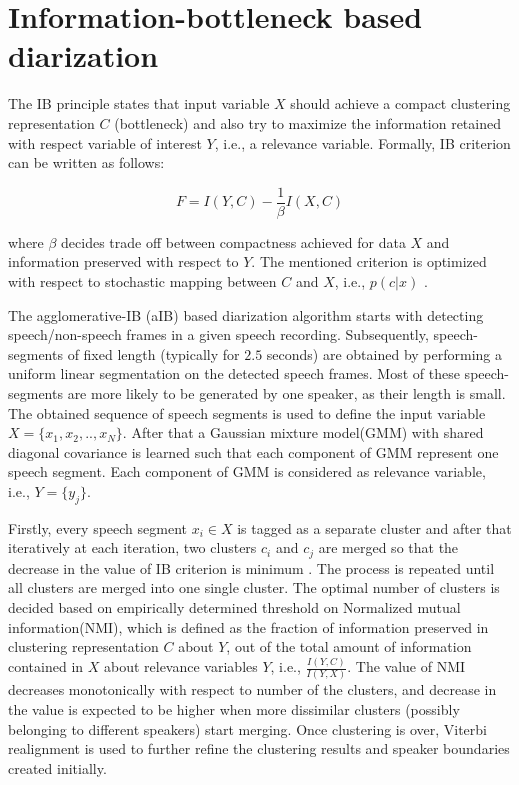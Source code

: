 \documentclass[conference]{IEEEtran}
\begin{document}
\section{Information-bottleneck based diarization}
\label{system}


The IB principle states that input variable $X$ should achieve a compact clustering representation $C$ (bottleneck) and also try to maximize the information retained with respect variable of interest $Y$, i.e., a relevance variable. Formally, IB criterion can be written as follows:

\begin{equation}
\label{eq:aIB}
F = I(Y,C) - \frac{1}{\beta}I(X,C) 
\end{equation} 

where $\beta$ decides trade off between compactness achieved for data $X$ and information preserved with respect to $Y$. The mentioned criterion is optimized with respect to stochastic mapping between $C$ and $X$, i.e., $p(c|x)$ . 

The agglomerative-IB (aIB) based diarization algorithm starts with detecting speech/non-speech frames in a given speech recording. Subsequently, speech-segments of fixed length (typically for $2.5$ seconds) are obtained by performing a uniform linear segmentation on the detected speech frames. Most of these speech-segments are more likely to be generated by one speaker, as their length is small. The obtained sequence of speech segments is used to define the input variable $X={\{x_1,x_2,..,x_N\}}$.  After that a Gaussian mixture model(GMM) with shared diagonal covariance is learned such that each component of GMM represent one speech segment. Each component of GMM is considered as relevance variable, i.e., $Y = \{ y_{j}\}$. 

Firstly, every speech segment $x_i \in X$ is tagged as a separate cluster and after that iteratively at each iteration, two clusters $c_i$ and $c_j$ are merged so that the decrease in the value of IB criterion is minimum \cite{aIB2}. The process is repeated until all clusters are merged into one single cluster. The optimal number of clusters is decided based on empirically determined threshold on Normalized mutual information(NMI), which is defined as the fraction of information preserved in clustering representation $C$ about $Y$, out of the total amount of information contained in $X$ about relevance variables $Y$, i.e., $\frac{I(Y,C)}{I(Y,X)}$. The value of NMI decreases monotonically with respect to number of the clusters, and decrease in the value is expected to be higher when more dissimilar clusters (possibly belonging to different speakers) start merging.  Once clustering is over, Viterbi realignment is used to further refine the clustering results and speaker boundaries created initially.
\end{document}
